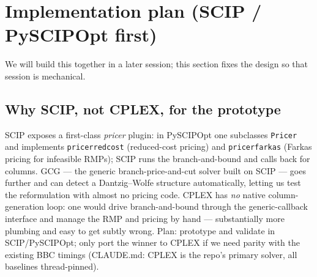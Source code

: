 \documentclass[11pt,a4paper]{article}
\theoremstyle{plain}
\theoremstyle{definition}
\begin{document}
\section{Implementation plan (SCIP / PySCIPOpt first)}\label{sec:impl}
We will build this together in a later session; this section fixes the design so that session is
mechanical.

\subsection{Why SCIP, not CPLEX, for the prototype}
SCIP exposes a first-class \emph{pricer} plugin: in PySCIPOpt one subclasses \texttt{Pricer} and
implements \texttt{pricerredcost} (reduced-cost pricing) and \texttt{pricerfarkas} (Farkas
pricing for infeasible RMPs); SCIP runs the branch-and-bound and calls back for columns. GCG ---
the generic branch-price-and-cut solver built on SCIP --- goes further and can detect a
Dantzig--Wolfe structure automatically, letting us test the reformulation with almost no pricing
code. CPLEX has \emph{no} native column-generation loop: one would drive branch-and-bound through
the generic-callback interface and manage the RMP and pricing by hand --- substantially more
plumbing and easy to get subtly wrong. Plan: prototype and validate in SCIP/PySCIPOpt; only port
the winner to CPLEX if we need parity with the existing BBC timings (CLAUDE.md: CPLEX is the
repo's primary solver, all baselines thread-pinned).
\end{document}
